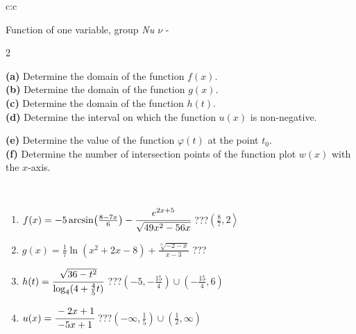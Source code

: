 \documentclass[10pt]{report}
\begin{document}
\begin{tabular}{c:c}
\begin{minipage}[c][104.5mm][t]{0.5\linewidth}
\begin{center}
\vspace{7mm}
{\huge Function of one variable, group \textit{Nu $\nu$} -}\\[5mm]
\begin{minipage}{0.95\linewidth}
\begin{center}
{\small \begin{multicols}{2} \raggedright
\textbf{(a)} Determine the domain of the function \(f(x)\). \\[1mm]
\textbf{(b)} Determine the domain of the function \(g(x)\). \\[1mm]
\textbf{(c)} Determine the domain of the function \(h(t)\). \\[1mm]
\textbf{(d)} Determine the interval on which the function \(u(x)\) is non-negative. \par \columnbreak
\textbf{(e)} Determine the value of the function \(\varphi(t)\) at the point \(t_0\). \\[1mm]
\textbf{(f)} Determine the number of intersection points of the function plot \(w(x)\) with the \(x\)-axis. \\[1mm]
\end{multicols}
}
\end{center}
\end{minipage}
\\[4mm]
\begin{minipage}{0.79\linewidth}
\begin{center}
\begin{varwidth}{\linewidth}
\begin{enumerate}
\small
\item $f(x) = -5\arcsin\!\left( \frac{8-7x}{6} \right) - \cfrac{e^{2x+5}}{\sqrt{49x^2-56x}}$\quad \dotfill\; ???\;\dotfill \quad $\left(\frac{8}{7} , 2\right\rangle$
\item $g(x) = \frac{1}{7} \ln{\!(x^2+2x-8)}+\frac{\sqrt[3]{-2-x}}{x-3}$\quad \dotfill\; ???\;\dotfill {}
\item $h(t) = \cfrac{\sqrt{36-t^2}}{\log_4(4+\frac{4}{5}t)}$\quad \dotfill\; ???\;\dotfill \quad $\left(-5 , -\frac{15}{4}\right)\cup\left(-\frac{15}{4} , 6\right)$
\item $u(x) = \cfrac{-2x+1}{-5x+1}$\quad \dotfill\; ???\;\dotfill \quad $\left(-\infty , \frac{1}{5}\right)\cup\left(\frac{1}{2} , \infty\right)$

\end{enumerate}
\end{varwidth}
\end{center}
\end{minipage}
\end{center}
\end{minipage}
\end{tabular}
\end{document}
